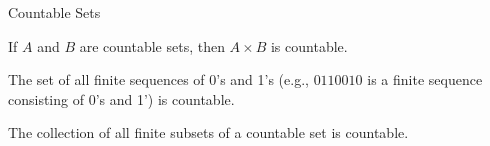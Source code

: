 \begin{section}{Countable Sets}
\begin{theorem}
If $A$ and $B$ are countable sets, then $A\times B$ is countable.
\end{theorem}

\begin{theorem}
The set of all finite sequences of 0's and 1's (e.g., $0110010$ is a finite sequence consisting of 0's and 1') is countable. 
\end{theorem}

\begin{theorem}
The collection of all finite subsets of a countable set is countable.
\end{theorem}

\end{section}